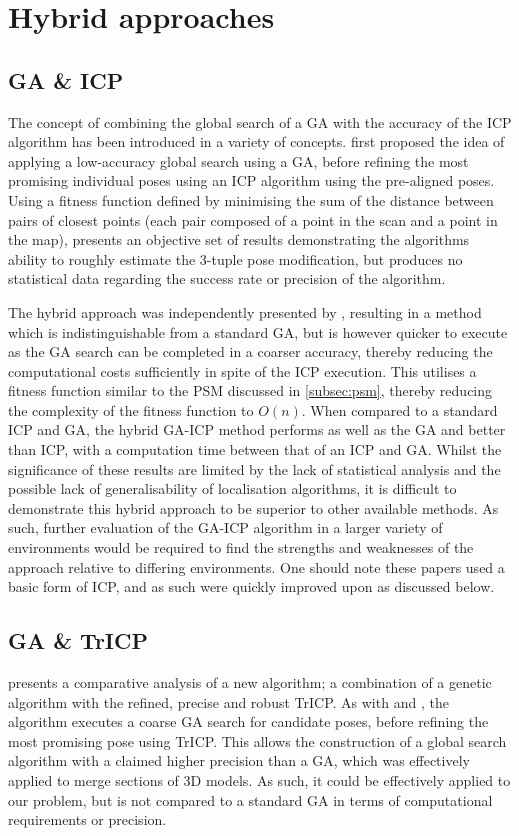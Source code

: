 \documentclass[authoryearcitations]{UoYCSproject}
\begin{document}
\section{Hybrid approaches}
\label{sec:hybrid_approaches}
\subsection{GA \& ICP}
The concept of combining the global search of a GA with the accuracy of the ICP algorithm has been introduced in a variety of concepts. \citet{Brunnstrom1996-vo} first proposed the idea of applying a low-accuracy global search using a GA, before refining the most promising individual poses using an ICP algorithm using the pre-aligned poses. Using a fitness function defined by minimising the sum of the distance between pairs of closest points (each pair composed of a point in the scan and a point in the map), \citeauthor{Brunnstrom1996-vo} presents an objective set of results demonstrating the algorithms ability to roughly estimate the 3-tuple pose modification, but produces no statistical data regarding the success rate or precision of the algorithm. 

The hybrid approach was independently presented by \citet{Martinez2006-ci}, resulting in a method which is indistinguishable from a standard GA, but is however quicker to execute as the GA search can be completed in a coarser accuracy, thereby reducing the computational costs sufficiently in spite of the ICP execution. This utilises a fitness function similar to the PSM discussed in \ref{subsec:psm}, thereby reducing the complexity of the fitness function to $O(n)$. When compared to a standard ICP and GA, the hybrid GA-ICP method performs as well as the GA and better than ICP, with a computation time between that of an ICP and GA. Whilst the significance of these results are limited by the lack of statistical analysis and the possible lack of generalisability of localisation algorithms, it is difficult to demonstrate this hybrid approach to be superior to other available methods. As such, further evaluation of the GA-ICP algorithm in a larger variety of environments would be required to find the strengths and weaknesses of the approach relative to differing environments. One should note these papers used a basic form of ICP, and as such were quickly improved upon as discussed below.


\subsection{GA \& TrICP}
\citet{Lomonosov2006-vq} presents a comparative analysis of a new algorithm; a combination of a genetic algorithm with the refined, precise and robust TrICP. As with \cite{Brunnstrom1996-vo} and \cite{Martinez2006-ci}, the algorithm executes a coarse GA search for candidate poses, before refining the most promising pose using TrICP. This allows the construction of a global search algorithm with a claimed higher precision than a GA, which was effectively applied to merge sections of 3D models. As such, it could be effectively applied to our problem, but is not compared to a standard GA in terms of computational requirements or precision. 
\end{document}
